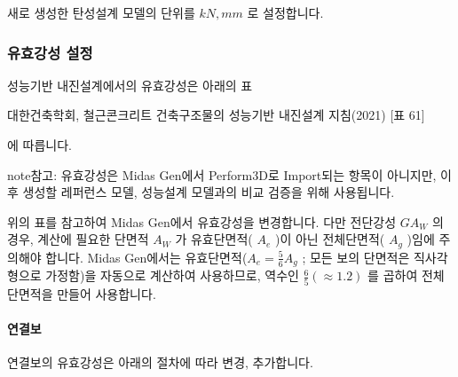 \documentclass[a4paper,10pt,korean]{sphinxmanual}
\begin{document}
\begin{sphinxShadowBox}

\sphinxAtStartPar
새로 생성한 탄성설계 모델의 단위를 \(kN, mm\) 로 설정합니다.
\end{sphinxShadowBox}

\sphinxstepscope


\subsubsection{유효강성 설정}
\label{\detokenize{1_stiffness_setting:id1}}\label{\detokenize{1_stiffness_setting::doc}}
\sphinxAtStartPar
성능기반 내진설계에서의 유효강성은 아래의 표%
\begin{footnote}[1]\sphinxAtStartFootnote
대한건축학회, 철근콘크리트 건축구조물의 성능기반 내진설계 지침(2021) {[}표 6\sphinxhyphen{}1{]}
%
\end{footnote} 에 따릅니다.

\begin{figure}[htbp]
\centering
\capstart

\noindent{}
\caption{}\label{\detokenize{1_stiffness_setting:id8}}\end{figure}

\begin{sphinxadmonition}{note}{참고:}
\sphinxAtStartPar
유효강성은 Midas Gen에서 Perform\sphinxhyphen{}3D로 Import되는 항목이 아니지만,
이 후 생성할 레퍼런스 모델, 성능설계 모델과의 비교 검증을 위해 사용됩니다.
\end{sphinxadmonition}

\sphinxAtStartPar
위의 표를 참고하여 Midas Gen에서 유효강성을 변경합니다. 다만 전단강성 \(GA_W\) 의 경우, 계산에 필요한 단면적 \(A_W\) 가
유효단면적( \(A_e\) )이 아닌 전체단면적( \(A_g\) )임에 주의해야 합니다.
Midas Gen에서는 유효단면적(\(A_e = \frac{5}{6}A_g\) ; 모든 보의 단면적은 직사각형으로 가정함)을 자동으로 계산하여 사용하므로,
역수인 \(\frac{6}{5}(\approx 1.2)\) 를 곱하여 전체단면적을 만들어 사용합니다.


\paragraph{연결보}
\label{\detokenize{1_stiffness_setting:id3}}
\sphinxAtStartPar
연결보의 유효강성은 아래의 절차에 따라 변경, 추가합니다.
\end{document}
